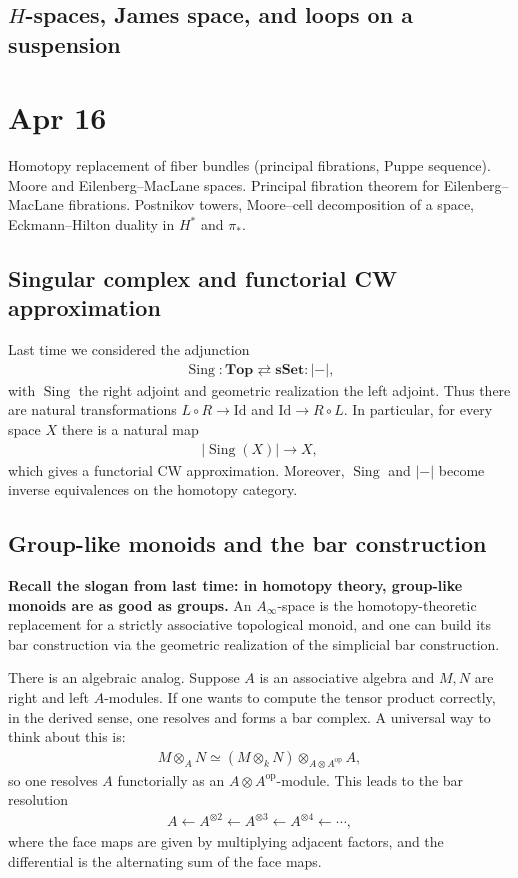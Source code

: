\documentclass[12pt]{article}
\begin{document}
    \subsection{$H$-spaces, James space, and loops on a suspension}

\section{Apr 16}
Homotopy replacement of fiber bundles (principal fibrations, Puppe sequence). Moore and Eilenberg--MacLane spaces.
Principal fibration theorem for Eilenberg--MacLane fibrations.
Postnikov towers, Moore--cell decomposition of a space, Eckmann--Hilton duality in $H^*$ and $\pi_*$.

\subsection{Singular complex and functorial CW approximation}
Last time we considered the adjunction
\begin{align*}
    \operatorname{Sing} : \mathbf{Top} \rightleftarrows \mathbf{sSet} : |{-}|,
\end{align*}
with $\operatorname{Sing}$ the right adjoint and geometric realization the left adjoint.
Thus there are natural transformations $L\circ R \to \mathrm{Id}$ and $\mathrm{Id} \to R\circ L$.
In particular, for every space $X$ there is a natural map
\begin{align*}
    |\operatorname{Sing}(X)| \to X,
\end{align*}
which gives a functorial CW approximation. Moreover, $\operatorname{Sing}$ and $|{-}|$ become inverse equivalences on the homotopy category.

\subsection{Group-like monoids and the bar construction}
\textbf{Recall the slogan from last time: in homotopy theory, group-like monoids are as good as groups.}
An $A_\infty$-space is the homotopy-theoretic replacement for a strictly associative topological monoid, and one can build its bar construction via the geometric realization of the simplicial bar construction.

There is an algebraic analog. Suppose $A$ is an associative algebra and $M,N$ are right and left $A$-modules. If one wants to compute the tensor product correctly, in the derived sense, one resolves and forms a bar complex. A universal way to think about this is:
\begin{align*}
    M \otimes_A N
    \simeq (M \otimes_k N) \otimes_{A \otimes A^{\mathrm{op}}} A,
\end{align*}
so one resolves $A$ functorially as an $A \otimes A^{\mathrm{op}}$-module. This leads to the bar resolution
\begin{align*}
    A \longleftarrow A^{\otimes 2} \longleftarrow A^{\otimes 3} \longleftarrow A^{\otimes 4} \longleftarrow \cdots,
\end{align*}
where the face maps are given by multiplying adjacent factors, and the differential is the alternating sum of the face maps.
\end{document}
